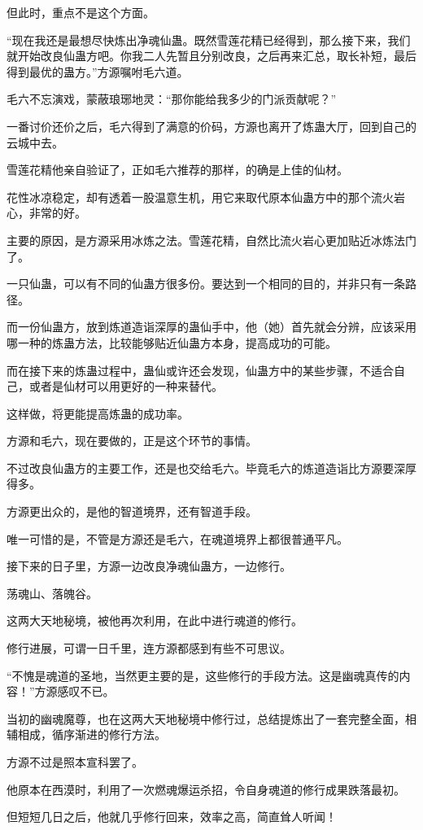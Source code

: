 \begin{this_body}
但此时，重点不是这个方面。

“现在我还是最想尽快炼出净魂仙蛊。既然雪莲花精已经得到，那么接下来，我们就开始改良仙蛊方吧。你我二人先暂且分别改良，之后再来汇总，取长补短，最后得到最优的蛊方。”方源嘱咐毛六道。

毛六不忘演戏，蒙蔽琅琊地灵：“那你能给我多少的门派贡献呢？”

一番讨价还价之后，毛六得到了满意的价码，方源也离开了炼蛊大厅，回到自己的云城中去。

雪莲花精他亲自验证了，正如毛六推荐的那样，的确是上佳的仙材。

花性冰凉稳定，却有透着一股温意生机，用它来取代原本仙蛊方中的那个流火岩心，非常的好。

主要的原因，是方源采用冰炼之法。雪莲花精，自然比流火岩心更加贴近冰炼法门了。

一只仙蛊，可以有不同的仙蛊方很多份。要达到一个相同的目的，并非只有一条路径。

而一份仙蛊方，放到炼道造诣深厚的蛊仙手中，他（她）首先就会分辨，应该采用哪一种的炼蛊方法，比较能够贴近仙蛊方本身，提高成功的可能。

而在接下来的炼蛊过程中，蛊仙或许还会发现，仙蛊方中的某些步骤，不适合自己，或者是仙材可以用更好的一种来替代。

这样做，将更能提高炼蛊的成功率。

方源和毛六，现在要做的，正是这个环节的事情。

不过改良仙蛊方的主要工作，还是也交给毛六。毕竟毛六的炼道造诣比方源要深厚得多。

方源更出众的，是他的智道境界，还有智道手段。

唯一可惜的是，不管是方源还是毛六，在魂道境界上都很普通平凡。

接下来的日子里，方源一边改良净魂仙蛊方，一边修行。

荡魂山、落魄谷。

这两大天地秘境，被他再次利用，在此中进行魂道的修行。

修行进展，可谓一日千里，连方源都感到有些不可思议。

“不愧是魂道的圣地，当然更主要的是，这些修行的手段方法。这是幽魂真传的内容！”方源感叹不已。

当初的幽魂魔尊，也在这两大天地秘境中修行过，总结提炼出了一套完整全面，相辅相成，循序渐进的修行方法。

方源不过是照本宣科罢了。

他原本在西漠时，利用了一次燃魂爆运杀招，令自身魂道的修行成果跌落最初。

但短短几日之后，他就几乎修行回来，效率之高，简直耸人听闻！


\end{this_body}
